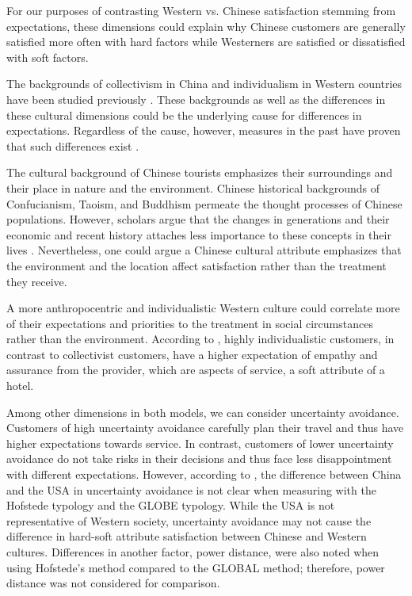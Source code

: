 \documentclass[smallextended,natbib]{svjour3}       %
\begin{document}
    For our purposes of contrasting Western vs. Chinese satisfaction stemming from expectations, these dimensions could explain why Chinese customers are generally satisfied more often with hard factors while Westerners are satisfied or dissatisfied with soft factors. 

    The backgrounds of collectivism in China and individualism in Western countries have been studied previously \cite[][]{gao2017chinese, kim2000}. These backgrounds as well as the differences in these cultural dimensions could be the underlying cause for differences in expectations. Regardless of the cause, however, measures in the past have proven that such differences exist \cite[][]{armstrong1997importance}. 

    The cultural background of Chinese tourists emphasizes their surroundings and their place in nature and the environment. Chinese historical backgrounds of Confucianism, Taoism, and Buddhism permeate the thought processes of Chinese populations. However, scholars argue that the changes in generations and their economic and recent history attaches less importance to these concepts in their lives \cite[][]{gao2017chinese}. Nevertheless, one could argue a Chinese cultural attribute emphasizes that the environment and the location affect satisfaction rather than the treatment they receive. 

    A more anthropocentric and individualistic Western culture could correlate more of their expectations and priorities to the treatment in social circumstances rather than the environment. According to \cite{donthu1998cultural}, highly individualistic customers, in contrast to collectivist customers, have a higher expectation of empathy and assurance from the provider, which are aspects of service, a soft attribute of a hotel.

    Among other dimensions in both models, we can consider uncertainty avoidance. Customers of high uncertainty avoidance carefully plan their travel and thus have higher expectations towards service. In contrast, customers of lower uncertainty avoidance do not take risks in their decisions and thus face less disappointment with different expectations. However, according to \cite{xiumei2011cultural}, the difference between China and the USA in uncertainty avoidance is not clear when measuring with the Hofstede typology and the GLOBE typology. While the USA is not representative of Western society, uncertainty avoidance may not cause the difference in hard-soft attribute satisfaction between Chinese and Western cultures. Differences in another factor, power distance, were also noted when using  Hofstede's method compared to the GLOBAL method; therefore, power distance was not considered for comparison.
\end{document}

